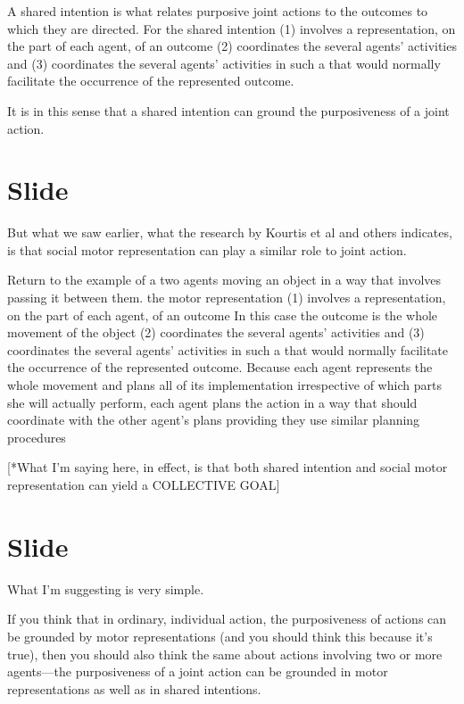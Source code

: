\documentclass[12pt,\papersize]{extarticle}
\begin{document}
A shared intention is what relates purposive joint actions to the outcomes to which they are directed.
For the shared intention
(1) involves a representation, on the part of each agent, of an outcome
(2) coordinates the several agents’ activities
and 
(3) coordinates the several agents’ activities in such a that would normally facilitate the occurrence of the represented outcome.

It is in this sense that a shared intention can ground the purposiveness of a joint action.




\section{Slide}
But what we saw earlier, what the research by Kourtis et al and others indicates, is that social motor representation can play a similar role to joint action.

Return to the example of a two agents moving an object in a way that involves passing it between them.
the motor representation
(1) involves a representation, on the part of each agent, of an outcome
In this case the outcome is the whole movement of the object
(2) coordinates the several agents’ activities
and 
(3) coordinates the several agents’ activities in such a that would normally facilitate the occurrence of the represented outcome.
Because each agent represents the whole movement and plans all of its implementation irrespective of which parts she will actually perform, each agent plans the action in a way that should coordinate with the other agent’s plans providing they use similar planning procedures

[*What I’m saying here, in effect, is that both shared intention and social motor representation can yield a COLLECTIVE GOAL]



\section{Slide}
What I’m suggesting is very simple.

If you think that in ordinary, individual action, the purposiveness of actions can be grounded by motor representations
(and you should think this because it’s true),
then you should also think the same about actions involving two or more agents---the purposiveness of a joint action can be grounded in motor representations as well as in shared intentions.
\end{document}
